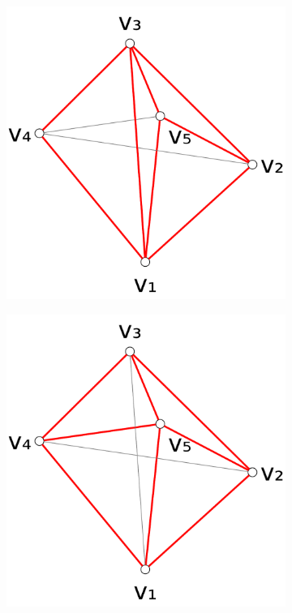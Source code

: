 \begin{figure}[ht]
  \centering
  \begin{subfigure}{0.3\textwidth}
    \centering
    \includegraphics[width=\textwidth]{img/example_triangulation_1.pdf}
    \caption{}
  \end{subfigure}
  \hspace{0em}
  \VRule
  \hspace{0em}
  \begin{subfigure}{0.3\textwidth}
    \centering
    \includegraphics[width=\textwidth]{img/example_triangulation_2.pdf}

\end{subfigure}
\end{figure}
